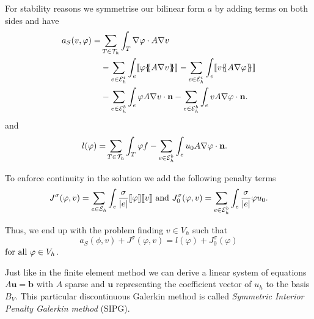 For stability reasons we symmetrise our bilinear form $a$ by adding terms on both sides and have
\begin{align}
 a_S(v, \varphi) = &\sum\limits_{T \in \triang} \int_T \nabla \varphi \cdot A \nabla v \nonumber \\
  &-\sum\limits_{e \in \edgesi}\int_{e} \jump {\varphi \average{A \nabla v} }
 - \sum\limits_{e \in \edgesi}\int_{e} \jump{ v \average{ A \nabla \varphi}} \nonumber\\ 
 & - \sum\limits_{e \in \edgesb}\int_{e} \varphi A \nabla v \cdot \mathbf n 
    - \sum\limits_{e \in \edgesb}\int_{e} v A \nabla \varphi \cdot \mathbf n.
\end{align}
and 
\begin{align}
	l(\varphi) =& \sum\limits_{T \in \mathcal{T}_h} \int_T \varphi f -\sum\limits_{e \in \mathcal{E}_h^b}\int_{e} u_0 A \nabla \varphi \cdot \mathbf n.
\end{align} 


To enforce continuity in the solution we add the following penalty terms \cite[3.2.2.]{PPO+2000} 
\begin{align}
	J^\sigma(\varphi, v) = \sum\limits_{e \in \mathcal{E}_h} \int_e \frac \sigma {|e|} \llbracket \varphi \rrbracket \llbracket v \rrbracket \textnormal{ and } 	J^\sigma_0(\varphi, v) = \sum\limits_{e \in \mathcal{E}_h^b} \int_e \frac \sigma {|e|} \varphi u_0 .
\end{align}

Thus, we end up with the problem finding $v \in V_h$ such that
\[
	a_S(\phi,v) + J^\sigma(\varphi,v) = l(\varphi) + J^\sigma_0(\varphi)
\] 
$  \textnormal{for all } \varphi \in V_h$.

Just like in the finite element method we can derive a linear system of equations $A \mathbf{u} = \mathbf{b}$ with $A$ sparse and $\mathbf{u}$ representing the coefficient vector of $u_h$ to the basis $B_V$.
This particular discontinuous Galerkin method is called \emph{Symmetric Interior Penalty Galerkin method} (SIPG).

